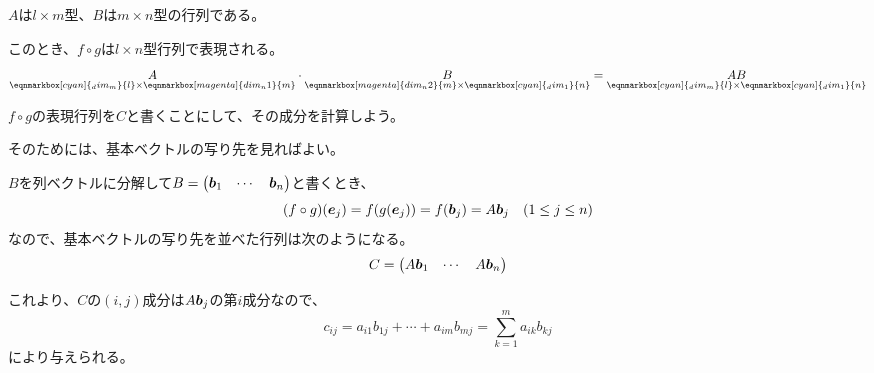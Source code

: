 \documentclass[../../../topic_linear-algebra]{subfiles}
\begin{document}
\br

$A$は$l \times m$型、$B$は$m \times n$型の行列である。

このとき、$f \circ g$は$l \times n$型行列で表現される。
\begin{equation*}
  \underset{\eqnmarkbox[cyan]{_dim_m}{l} \times \eqnmarkbox[magenta]{dim_n1}{m}}{A} \cdot \underset{\eqnmarkbox[magenta]{dim_n2}{m} \times \eqnmarkbox[cyan]{_dim_1}{n}}{B} = \underset{\eqnmarkbox[cyan]{_dim_m}{l} \times \eqnmarkbox[cyan]{_dim_1}{n}}{AB}
\end{equation*}

\br

$f \circ g$の表現行列を$C$と書くことにして、その成分を計算しよう。

そのためには、基本ベクトルの写り先を見ればよい。

\br

$B$を列ベクトルに分解して$B = \begin{pmatrix}\vb*{b}_1 & \cdots & \vb*{b}_n\end{pmatrix}$と書くとき、
\begin{equation*}
  (f \circ g)(\vb*{e}_j) = f(g(\vb*{e}_j)) = f(\vb*{b}_j) = A \vb*{b}_j \quad (1 \leq j \leq n)
\end{equation*}
なので、基本ベクトルの写り先を並べた行列は次のようになる。
\begin{equation*}
  C = \begin{pmatrix} A\vb*{b}_1 & \cdots & A\vb*{b}_n \end{pmatrix}
\end{equation*}

\br

これより、$C$の$(i, j)$成分は$A\vb*{b}_j$の第$i$成分なので、
\begin{equation*}
  c_{ij} = a_{i1} b_{1j} + \cdots + a_{im} b_{mj} = \sum_{k=1}^m a_{ik} b_{kj}
\end{equation*}
により与えられる。

\br
\end{document}
